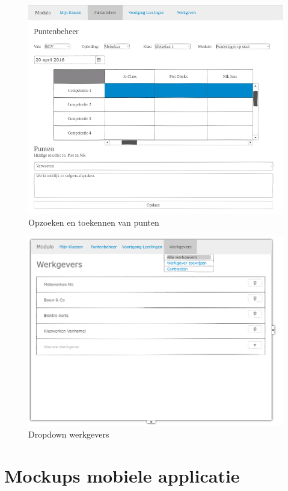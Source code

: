 \documentclass[a4paper]{article}
\begin{document}
\begin{appendices}
\begin{figure}[H]
  \centerline{\includegraphics[width=\textwidth]{web_punten}}
  \caption{Opzoeken en toekennen van punten}
  \label{fig:web_punten}
\end{figure}

\begin{figure}[H]
  \centerline{\includegraphics[width=\textwidth]{web_werkgevers_dropdown}}
  \caption{Dropdown werkgevers}
  \label{fig:web_werkgevers_dropdown}
\end{figure}
\newpage


\newpage
\section{Mockups mobiele applicatie}


\end{appendices}
\end{document}
